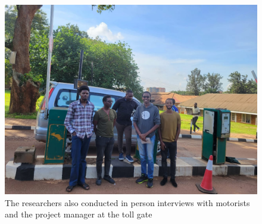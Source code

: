 \begin{appendices}
    \cleaprage
    \begin{figure}
        \begin{center}
            \includegraphics[scale = 0.3]{images/rizz}
            \caption{The researchers also conducted in person interviews with motorists and the project manager at the toll gate}
        \end{center}
    \end{figure}
\end{appendices}